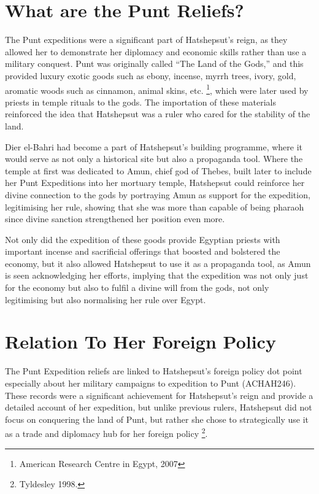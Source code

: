 \documentclass[12pt, letterpaper]{article}
\begin{document}
\section*{What are the Punt Reliefs?}
The Punt expeditions were a significant part of Hatshepsut's reign, as they allowed her to demonstrate her diplomacy and economic skills rather than use a military conquest. Punt was originally called “The Land of the Gods,” and this provided luxury exotic goods such as ebony, incense, myrrh trees, ivory, gold, aromatic woods such as cinnamon, animal skins, etc. \footnote{American Research Centre in Egypt, 2007}, which were later used by priests in temple rituals to the gods. The importation of these materials reinforced the idea that Hatshepsut was a ruler who cared for the stability of the land.

Dier el-Bahri had become a part of Hatshepsut's building programme, where it would serve as not only a historical site but also a propaganda tool. Where the temple at first was dedicated to Amun, chief god of Thebes, built later to include her Punt Expeditions into her mortuary temple, Hatshepsut could reinforce her divine connection to the gods by portraying Amun as support for the expedition, legitimising her rule, showing that she was more than capable of being pharaoh since divine sanction strengthened her position even more.

Not only did the expedition of these goods provide Egyptian priests with important incense and sacrificial offerings that boosted and bolstered the economy, but it also allowed Hatshepsut to use it as a propaganda tool, as Amun is seen acknowledging her efforts, implying that the expedition was not only just for the economy but also to fulfil a divine will from the gods, not only legitimising but also normalising her rule over Egypt.


\section*{Relation To Her Foreign Policy}
The Punt Expedition reliefs are linked to Hatshepsut's foreign policy dot point especially about her military campaigns to expedition to Punt (ACHAH246). These records were a significant achievement for Hatshepsut's reign and provide a detailed account of her expedition, but unlike previous rulers, Hatshepsut did not focus on conquering the land of Punt, but rather she chose to strategically use it as a trade and diplomacy hub for her foreign policy \footnote{Tyldesley 1998.}.
\end{document}
